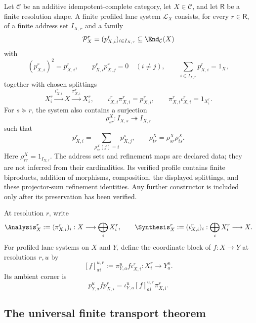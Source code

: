 \begin{definition}
\label{def:block15-finite-profiled-lane-system}
Let \(\mathcal C\) be an additive idempotent-complete category, let
\(X\in\mathcal C\), and let \(\mathsf R\) be a finite resolution shape.  A
finite profiled lane system \(\mathcal L_X\) consists, for every
\(r\in\mathsf R\), of a finite address set \(I_{X,r}\) and a family
\[
 \mathcal P_X^r=(p_{X,i}^r)_{i\in I_{X,r}}
 \subseteq\End_{\mathcal C}(X)
\]
with
\[
 (p_{X,i}^r)^2=p_{X,i}^r,
 \qquad
 p_{X,i}^rp_{X,j}^r=0\quad(i\ne j),
 \qquad
 \sum_{i\in I_{X,r}}p_{X,i}^r=1_X,
\]
together with chosen splittings
\[
 X_i^r\xrightarrow{\iota_{X,i}^r}X
 \xrightarrow{\pi_{X,i}^r}X_i^r,
 \qquad
 \iota_{X,i}^r\pi_{X,i}^r=p_{X,i}^r,
 \qquad
 \pi_{X,i}^r\iota_{X,i}^r=1_{X_i^r}.
\]
For \(s\succeq r\), the system also contains a surjection
\[
 \rho^X_{sr}:I_{X,s}\twoheadrightarrow I_{X,r}
\]
such that
\[
 p_{X,i}^r
 =
 \sum_{\rho^X_{sr}(j)=i}p_{X,j}^s,
 \qquad
 \rho^X_{tr}=\rho^X_{sr}\rho^X_{ts}.
\]
Here \(\rho^X_{rr}=1_{I_{X,r}}\).  The address sets and refinement maps are
declared data; they are not inferred from their cardinalities.
Its verified profile contains finite biproducts, addition of morphisms,
composition, the displayed splittings, and these projector-sum refinement
identities.  Any further constructor is included only after its preservation
has been verified.
\end{definition}

At resolution \(r\), write
\[
 \Analysis_X^r
 :=(\pi_{X,i}^r)_i:
 X\longrightarrow\bigoplus_iX_i^r,
 \qquad
 \Synthesis_X^r
 :=(\iota_{X,i}^r)_i:
 \bigoplus_iX_i^r\longrightarrow X.
\]
For profiled lane systems on \(X\) and \(Y\), define the coordinate block of
\(f:X\to Y\) at resolutions \(r,u\) by
\[
 [f]^{u,r}_{a i}
 :=
 \pi_{Y,a}^u f\iota_{X,i}^r:
 X_i^r\longrightarrow Y_a^u.
\]
Its ambient corner is
\[
 p_{Y,a}^u f p_{X,i}^r
 =
 \iota_{Y,a}^u[f]^{u,r}_{a i}\pi_{X,i}^r.
\]

\subsection{The universal finite transport theorem}
\label{subsec:block15-main-theorem}

